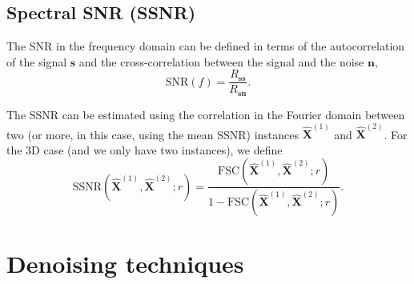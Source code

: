 \documentclass{article}
\begin{document}

\subsection{Spectral SNR (SSNR)}
\label{sec:SSNR}

The SNR in the frequency domain can be defined in terms of the
autocorrelation of the signal $\mathbf{s}$ and the cross-correlation
between the signal and the noise $\mathbf{n}$,
\begin{equation}
  \text{SNR}(f) = \frac{R_{\mathbf{ss}}}{R_{\mathbf{sn}}}.
\end{equation}

The SSNR can be estimated using the correlation in the Fourier domain
between two (or more, in this case, using the mean SSNR) instances
$\hat{\mathbf{X}}^{(1)}$ and $\hat{\mathbf{X}}^{(2)}$. For the 3D case
(and we only have two instances), we define
\cite{verbeke2024self,unser1987new}
\begin{equation}
\text{SSNR}(\hat{\mathbf{X}}^{(1)}, \hat{\mathbf{X}}^{(2)}; r) = \frac{\text{FSC}(\hat{\mathbf{X}}^{(1)}, \hat{\mathbf{X}}^{(2)}; r)}{1-\text{FSC}(\hat{\mathbf{X}}^{(1)}, \hat{\mathbf{X}}^{(2)}; r)}.
\end{equation}


\section{Denoising techniques}

\end{document}

